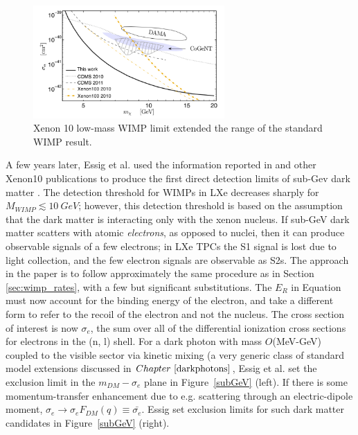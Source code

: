\begin{figure}[htbp]
\begin{center}
\includegraphics[width=0.65\textwidth]{figures/lxetpcs/xenon10lowmass.png}
\caption{Xenon 10 low-mass WIMP limit extended the range of the standard WIMP result. }
\label{fig:xenon10lowmass}
\end{center}
\end{figure}


A few years later, Essig et al. used the information reported in \cite{Angle2011} and other Xenon10 publications to produce the first direct detection limits of sub-Gev dark matter \cite{Essig2012}. The detection threshold for \ac{WIMP}s in \ac{LXe} decreases sharply for $M_{WIMP} \lesssim 10~GeV$; however, this detection threshold is based on the assumption that the dark matter is interacting only with the xenon nucleus. If sub-GeV dark matter scatters with atomic \textit{electrons}, as opposed to nuclei, then it can produce observable signals of a few electrons; in \ac{LXe} \ac{TPC}s the S1 signal is lost due to light collection, and the few electron signals are observable as S2s. The approach in the paper is to follow approximately the same procedure as in Section~ \ref{sec:wimp_rates}, with a few but significant substitutions. The $E_{R}$ in Equation~\label{eq:recoil} must now account for the binding energy of the electron, and take a different form to refer to the recoil of the electron and not the nucleus. The cross section of interest is now $\sigma_{e}$, the sum over all of the differential ionization cross sections for electrons in the (n, l) shell. For a dark photon with mass $O$(MeV-GeV) coupled to the visible sector via kinetic mixing (a very generic class of standard model extensions discussed in $Chapter~\ref{darkphotons}$, Essig et al. set the exclusion limit in the $m_{DM}-\sigma_{e}$ plane in Figure~\ref{subGeV} (left). If there is some momentum-transfer enhancement due to e.g. scattering through an electric-dipole moment, $\sigma_{e} \longrightarrow \sigma_{e}F_{DM}(q) \equiv \bar{\sigma_{e}}$. Essig set exclusion limits for such dark matter candidates in Figure~\ref{subGeV} (right).


